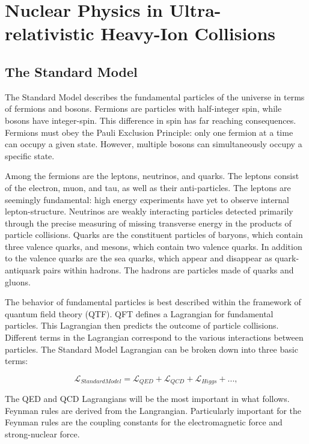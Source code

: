 
\chapter{Nuclear Physics in Ultra-relativistic Heavy-Ion Collisions}

\section{The Standard Model}

The Standard Model describes the fundamental particles of the universe in terms of fermions and bosons. Fermions are particles with half-integer spin, while bosons have integer-spin. This difference in spin has far reaching consequences. Fermions must obey the Pauli Exclusion Principle: only one fermion at a time can occupy a given state. However, multiple bosons can simultaneously occupy a specific state.

Among the fermions are the leptons, neutrinos, and quarks. The leptons consist of the electron, muon, and tau, as well as their anti-particles. The leptons are seemingly fundamental: high energy experiments have yet to observe internal lepton-structure. Neutrinos are weakly interacting particles detected primarily through the precise measuring of missing transverse energy in the products of particle collisions. Quarks are the constituent particles of baryons, which contain three valence quarks, and mesons, which contain two valence quarks. In addition to the valence quarks are the sea quarks, which appear and disappear as quark-antiquark pairs within hadrons. The hadrons are particles made of quarks and gluons.

The behavior of fundamental particles is best described within the framework of quantum field theory (QTF). QFT defines a Lagrangian for fundamental particles. This Lagrangian then predicts the outcome of particle collisions. Different terms in the Lagrangian correspond to the various interactions between particles. The Standard Model Lagrangian can be broken down into three basic terms:

\begin{equation}
\mathcal{L}_{Standard Model} = \mathcal{L}_{QED} + \mathcal{L}_{QCD} + \mathcal{L}_{Higgs} + ... ,  
\end{equation}

The QED and QCD Lagrangians will be the most important in what follows. Feynman rules are derived from the Langrangian. Particularly important for the Feynman rules are the coupling constants for the electromagnetic force and strong-nuclear force. 


